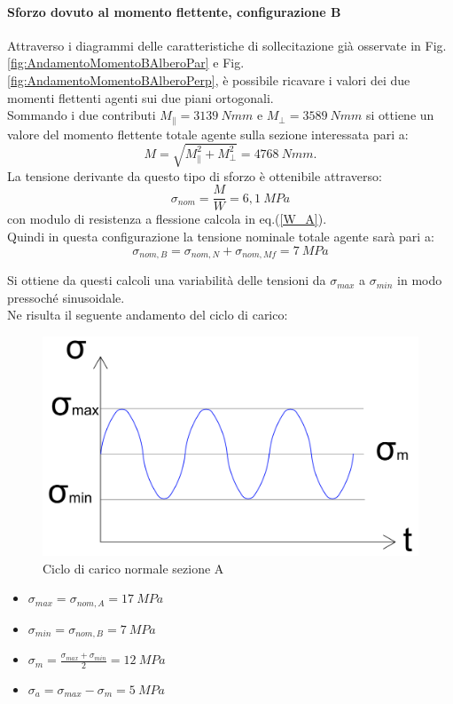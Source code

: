 \paragraph{Sforzo dovuto al momento flettente, configurazione B}Attraverso i diagrammi delle caratteristiche di sollecitazione già osservate in Fig.\ref{fig:AndamentoMomentoBAlberoPar} e Fig.\ref{fig:AndamentoMomentoBAlberoPerp}, è possibile ricavare i valori dei due momenti flettenti agenti sui due piani ortogonali.\\ 
Sommando i due contributi $M_{\parallel}=3139\ Nmm$ e $M_{\perp}=3589\ Nmm$ si ottiene un valore del momento flettente totale agente sulla sezione interessata pari a:
\begin{equation}
    M=\sqrt{M_{\parallel}^2+M_{\perp}^2}=4768\ Nmm.
\end{equation}
La tensione derivante da questo tipo di sforzo è ottenibile attraverso:
\begin{equation}
    \sigma_{nom}=\frac{M}{W}=6,1\ MPa
\end{equation}
con modulo di resistenza a flessione calcola in eq.(\ref{W_A}).\\
Quindi in questa configurazione la tensione nominale totale agente sarà pari a:
\begin{equation}
    \sigma_{nom,B}=\sigma_{nom,N}+\sigma_{nom,Mf}=7\ MPa
\end{equation}

Si ottiene da questi calcoli una variabilità delle tensioni da $\sigma_{max}$ a $\sigma_{min}$ in modo pressoché sinusoidale.\\
Ne risulta il seguente andamento del ciclo di carico:
\begin{figure}[h]
    \centering
    \includegraphics[scale=0.35]{Immagini/CicloFaticaANormale.png}
    \caption{Ciclo di carico normale sezione A}
    \label{fig:CicloFaticaANormale}
\end{figure}
\begin{itemize}
    \item $\sigma_{max}=\sigma_{nom,A}=17\ MPa$
    \item $\sigma_{min}=\sigma_{nom,B}=7\ MPa$
    \item $\sigma_m=\frac{\sigma_{max}+\sigma_{min}}{2}=12\ MPa$
    \item $\sigma_a=\sigma_{max}-\sigma_m=5\ MPa$
\end{itemize}
